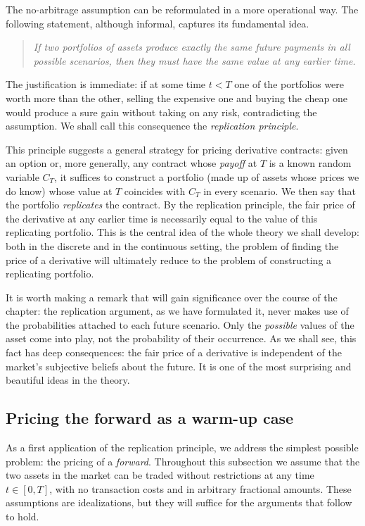 \documentclass[11pt,a4paper,oneside]{report}
\theoremstyle{plain}
\theoremstyle{definition}
\theoremstyle{remark}
\newcommand{\1}{\mathbf{1}}
\begin{document}
The no-arbitrage
assumption can be reformulated in a more operational way. The
following statement, although informal, captures its fundamental idea.

\begin{quote}
\emph{If two portfolios of assets produce exactly the same future
payments in all possible scenarios, then they must have the same value
at any earlier time.}
\end{quote}

The justification is immediate: if at some time $t < T$ one of the
portfolios were worth more than the other, selling the expensive one
and buying the cheap one would produce a sure gain without taking on
any risk, contradicting the assumption. We shall call this consequence
the \emph{replication principle}.

This principle suggests a general strategy for pricing derivative
contracts: given an option or, more generally, any contract whose
\emph{payoff} at $T$ is a known random variable $C_T$, it suffices to
construct a portfolio (made up of assets whose prices we do know)
whose value at $T$ coincides with $C_T$ in every scenario. We then say
that the portfolio \emph{replicates} the contract. By the replication
principle, the fair price of the derivative at any earlier time is
necessarily equal to the value of this replicating portfolio. This is
the central idea of the whole theory we shall develop: both in the
discrete and in the continuous setting, the problem of finding the
price of a derivative will ultimately reduce to the problem of
constructing a replicating portfolio.

It is worth making a
remark that will gain significance over the course of the chapter:
the replication argument, as we have formulated it, never makes use of
the probabilities attached to each future scenario. Only the
\emph{possible} values of the asset come into play, not the
probability of their occurrence. As we shall see, this fact has deep
consequences: the fair price of a derivative is independent of the
market's subjective beliefs about the future. It is one of the most
surprising and beautiful ideas in the theory.

\subsection{Pricing the forward as a warm-up case}
\label{subsec:forward}

As a first application of the replication principle, we address the
simplest possible problem: the pricing of a \emph{forward}. Throughout
this subsection we assume that the two assets in the market can be
traded without restrictions at any time $t \in [0, T]$, with no
transaction costs and in arbitrary fractional amounts. These
assumptions are idealizations, but they will suffice for the arguments
that follow to hold.
\end{document}
